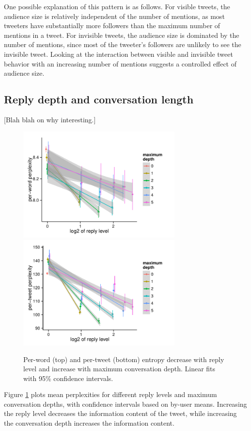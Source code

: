 \documentclass[11pt,letterpaper]{article}
\begin{document}
One possible explanation of this pattern is as follows. For visible tweets, the audience size is relatively independent of the number of mentions, as most tweeters have substantially more followers than the maximum number of mentions in a tweet.  For invisible tweets, the audience size is dominated by the number of mentions, since most of the tweeter's followers are unlikely to see the invisible tweet.  Looking at the interaction between visible and invisible tweet behavior with an increasing number of mentions suggests a controlled effect of audience size.

\subsection{Reply depth and conversation length}
[Blah blah on why interesting.]

\begin{figure}[t]
 \centering
  \includegraphics[width=3.25in]{figures/cmcl-rlevel-pw.pdf}
  \includegraphics[width=3.25in]{figures/cmcl-rlevel-pt.pdf}
 \caption{Per-word (top) and per-tweet (bottom) entropy decrease with reply level and increase with maximum conversation depth. Linear fits with 95\% confidence intervals.}\label{fig:rlevel-maxdesc}\vspace*{-.5em}
\end{figure}


Figure \ref{fig:rlevel-maxdesc} plots mean perplexities for different reply levels and maximum conversation depths, with confidence intervals based on by-user means. Increasing the reply level decreases the information content of the tweet, while increasing the conversation depth increases the information content.
\end{document}
